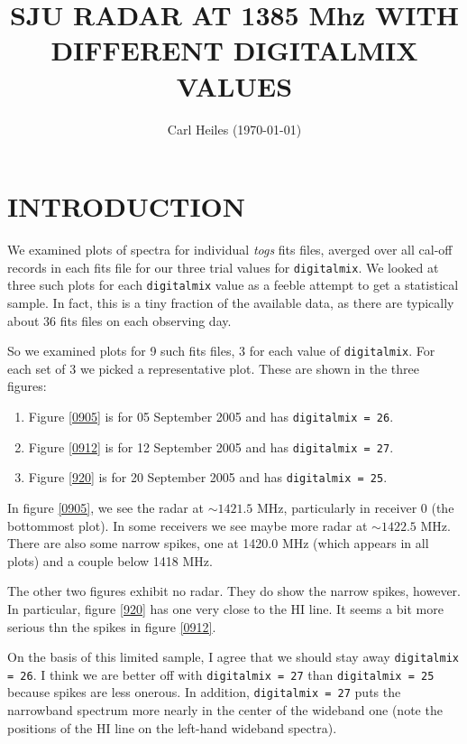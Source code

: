 \documentclass[psfig,preprint]{aastex}
\begin{document}
                                                                                
\title{SJU RADAR AT 1385 Mhz WITH DIFFERENT DIGITALMIX VALUES}

\author{Carl Heiles (\today)}


\section{INTRODUCTION}

	We examined plots of spectra for individual {\it togs} fits
files, averged over all cal-off records in each fits file for our three
trial values for \verb$digitalmix$. We looked at
three such plots for each \verb$digitalmix$ value as a feeble attempt to
get a statistical sample. In fact, this is a tiny fraction of the
available data, as there are typically about 36 fits files on each
observing day. 

	So we examined plots for 9 such fits files, 3 for each value of
\verb$digitalmix$. For each set of 3 we picked a representative plot.
These are shown in the three figures: \begin{enumerate}
	\item Figure \ref{0905} is for 05 September 2005 and has
\verb$digitalmix = 26$.
	\item Figure \ref{0912} is for 12 September 2005 and has
\verb$digitalmix = 27$.
	\item Figure \ref{920} is for 20 September 2005 and has
\verb$digitalmix = 25$.
\end{enumerate}

	In figure \ref{0905}, we see the radar at $\sim 1421.5$ MHz, 
particularly in receiver 0 (the bottommost plot). In some receivers we 
see maybe more radar at $\sim 1422.5$ MHz. There are also some narrow
spikes, one at 1420.0 MHz (which appears in all plots) and a couple
below 1418 MHz.

	The other two figures exhibit no radar. They do show the narrow
spikes, however. In particular, figure \ref{920} has one very close to
the HI line. It seems a bit more serious thn the spikes in figure
\ref{0912}. 

	On the basis of this limited sample, I agree that we should stay
away \verb$digitalmix = 26$.  I think we are better off with
\verb$digitalmix = 27$ than \verb$digitalmix = 25$ because spikes are
less onerous.  In addition, \verb$digitalmix = 27$ puts the narrowband
spectrum more nearly in the center of the wideband one (note the
positions of the HI line on the left-hand wideband spectra). 
\end{document}
